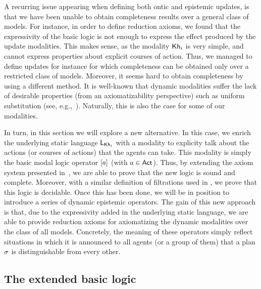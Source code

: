 A recurring issue appearing when defining both ontic and epistemic updates, is that we have been unable to obtain completeness results over a general class of models. For instance, in order to define reduction axioms, we found that the expressivity of the basic logic is not enough to express the effect produced by the update modalities. This makes sense, as the modality ${\sf Kh}_i$ is very simple, and cannot express properties about explicit courses of action. Thus, we managed to define updates for instance for which completeness can be obtained only over a restricted class of models. Moreover, it seems hard to obtain completeness by using a different method. It is well-known that dynamic modalities suffer the lack of desirable properties (from an axiomatizability perspective) such as uniform substitution (see, e.g.,~\cite{HoHoIc11,ArecesFH15}). Naturally, this is also the case for some of our modalities. 

In turn, in this section we will explore a new alternative. In this case, we enrich the underlying static language $\mathsf{L}_{{\sf Kh}_i}$ with a modality to explicity talk about the actions (or courses of actions) that the agents can take. This modality is simply the basic modal logic operator $[a]$ (with $a\in{\rm \sf Act}$). 
Thus, by extending the axiom system presented in~, we are able to prove that the new logic is sound and complete.
Moreover, with a similar definition of filtrations used in \cite{mlbook}, we prove that this logic is decidable.  
Once this has been done, we will be in position to introduce a series of dynamic epistemic operators. The gain of this new approach is that, due to the expressivity added in the underlying static language, we are able to provide reduction axioms for axiomatizing the dynamic modalities over the class of all models.
Concretely, the meaning of these operators simply reflect situations in which it is announced to all agents (or a group of them) that a plan $\sigma$ is distinguishable from every other.

\subsection{The extended basic logic}

